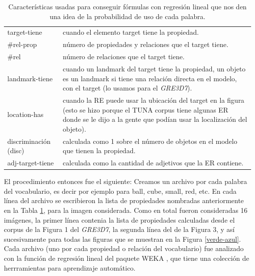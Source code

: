 \begin{small}
\begin{table}[H]
\begin{center}
\begin{tabular}{|l|p{10cm}|}
\hline
target-tiene & cuando el elemento target tiene la propiedad. \\
\#rel-prop & n\'umero de propiedades y relaciones que el target tiene.\\
\#rel & n\'umero de relaciones que el target tiene. \\
landmark-tiene & cuando un landmark del target tiene la propiedad, un objeto es un landmark si tiene una relaci\'on directa en el modelo, con el target (lo usamos para el \textit{GRE3D7}).\\
location-has & cuando la RE puede usar la ubicaci\'on del target en la figura (esto se hizo porque el TUNA corpus tiene algunas ER donde se le dijo a la gente que pod\'ian usar la localizaci\'on del objeto).\\
discriminaci\'on (disc) & calculada como 1 sobre el n\'umero de objetos en el modelo que tienen la propiedad.  \\
adj-target-tiene & calculada como la cantidad de adjetivos que la ER contiene.\\
\hline
\end{tabular}
\caption{Caracter\'isticas usadas para conseguir f\'ormulas con regresi\'on lineal que nos den una idea de la probabilidad de uso de cada palabra.} 
\label{features}
\end{center}
\end{table}
\end{small}

El procedimiento entonces fue el siguiente:
Creamos un archivo por cada palabra del vocabulario, es decir por ejemplo para ball, cube, small, red, etc. En cada l\'inea del archivo 
se escribieron la lista de propiedades nombradas anteriormente en la Tabla \ref{features}, para la imagen considerada. Como en total 
fueron consideradas 16 im\'agenes, la primer l\'inea contenia la lista de propiedades calculadas desde el corpus de la Figura 1 del \textit{GRE3D7}, 
la segunda l\'inea del de la Figura 3, y as\'i sucesivamente para todas las figuras que se muestran en la Figura \ref{verde-azul}. 
Cada archivo (uno por cada propiedad o relaci\'on del vocabulario) fue analizado con la funci\'on de regresi\'on lineal del paquete WEKA 
\cite{Hall:WEK09}, que tiene una colecci\'on de herrramientas para aprendizaje autom\'atico.

